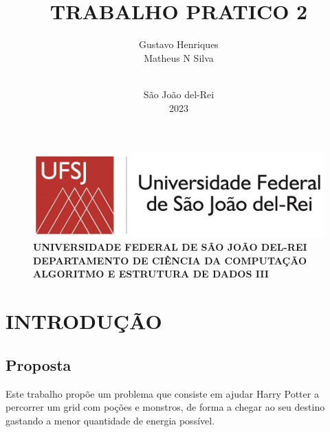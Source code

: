\documentclass[12pt]{article}
\begin{document}
    \begin{figure}
        \centering
        \includegraphics[width=0.35\linewidth]{Figuras/ufsj-logo-2018}
        \\\setlength{\parskip}{1cm}
        \textbf{UNIVERSIDADE FEDERAL DE SÃO JOÃO DEL-REI \\
         DEPARTAMENTO DE CIÊNCIA DA COMPUTAÇÃO\\
         ALGORITMO E ESTRUTURA DE DADOS III}\\

        \label{fig:ufsj-logo-2018}
    \end{figure}
    
    \author{Gustavo Henriques \\ Matheus N Silva}

    \title{ 
        \vspace{6cm} %
		    \textbf{TRABALHO PRATICO 2}
		\vspace{6cm} %
	}
    \date{$ $\\ São João del-Rei \\ 2023}
    \maketitle
    \thispagestyle{empty} %
    \newpage
    
    \setcounter{page}{1} %
    \listoffigures
    \listoftables
    \newpage

    \tableofcontents %
    \newpage
    
    
    \setcounter{page}{1} %
    \section{INTRODUÇÃO} %
        \subsection{Proposta}
        Este trabalho propõe um problema que consiste em ajudar Harry Potter a percorrer 
        um grid com poções e monstros, de forma a chegar ao seu destino gastando a menor 
        quantidade de energia possível.
            
\end{document}

